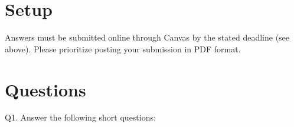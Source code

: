 \documentclass[12pt]{article}
\begin{document}
\singlespacing


\bigskip

\doublespacing



\section*{Setup}

\noindent 
Answers must be submitted online through Canvas by the stated deadline (see above).
Please prioritize posting your submission in PDF format.

\section*{Questions}

\noindent Q1. Answer the following short questions:
\end{document}
